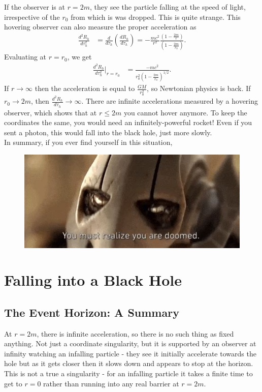 \documentclass[a4paper, 11pt, normalem]{report}
\begin{document}
If the observer is at $r=2m$, they see the particle falling at the speed of light, irrespective of the $r_0$ from which is was dropped. 
This is quite strange.
This hovering observer can also measure the proper acceleration as
\begin{align}
    \frac{d^2R_h}{d\tau_h^2} &= \frac{d}{d\tau_h}\left(\frac{dR_h}{d\tau_h}\right) = -\frac{mc^2}{r^2}\frac{\left(1-\frac{2m}{r}\right)}{\left(1-\frac{2m}{r_0}\right)}.
\end{align}
Evaluating at $r=r_0$, we get
\begin{align}
    \frac{d^2R_h}{d\tau_h^2}\bigg|_{r=r_0} &=\frac{-mc^2}{r_0^2\left(1-\frac{2m}{r_0}\right)^{1/2}}.
\end{align}
If $r\to\infty$ then the acceleration is equal to $\frac{GM}{r_0^2}$, so Newtonian physics is back.
If $r_0\to2m$, then $\frac{d^2R_h}{d\tau_h}\to\infty$.
There are infinite accelerations measured by a hovering observer, which shows that at $r\leq2m$ you cannot hover anymore. 
To keep the coordinates the same, you would need an infinitely-powerful rocket!
Even if you sent a photon, this would fall into the black hole, just more slowly. \\
In summary, if you ever find yourself in this situation, 
\begin{figure}[H]
    \centering
    \includegraphics[scale=0.7]{gg.jpg}
\end{figure}

\chapter{Falling into a Black Hole}
\section{The Event Horizon: A Summary}
At $r=2m$, there is infinite acceleration, so there is no such thing as fixed anything. 
Not just a coordinate singularity, but it is supported by an observer at infinity watching an infalling particle - they see it initially accelerate towards the hole but as it gets closer then it slows down and appears to stop at the horizon. 
This is not a true a singularity - for an infalling particle it takes a finite time to get to $r=0$ rather than running into any real barrier at $r=2m$.
\end{document}
